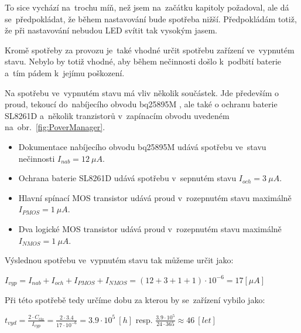 To sice vychází na~trochu míň, než jsem na~začátku kapitoly požadoval, ale dá se~předpokládat, že během nastavování bude spotřeba nižší.
Předpokládám totiž, že při nastavování nebudou LED svítit tak vysokým jasem.


Kromě spotřeby za provozu je~také vhodné určit spotřebu zařízení ve~vypnutém stavu.
Nebylo by totiž vhodné, aby během nečinnosti došlo k~podbití baterie a~tím pádem k~jejímu poškození.

Na spotřebu ve~vypnutém stavu má vliv několik součástek.
Jde především o proud, tekoucí do~nabíjecího obvodu bq25895M \cite{BQ25895}, ale také o ochranu baterie SL8261D \cite{SL8261} a~několik tranzistorů v~zapínacím obvodu uvedeném na~obr.~\ref{fig:PoverManager}.

\begin{itemize}
    \item Dokumentace nabíjecího obvodu bq25895M \cite{BQ25895} udává spotřebu ve~stavu nečinnosti \(I_{nab} = 12~\mu A\).
    \item Ochrana baterie SL8261D \cite{SL8261} udává spotřebu v~sepnutém stavu \(I_{och} = 3~\mu A\).
    \item Hlavní spínací MOS transistor \cite{WSD20L75DN33} udává proud v~rozepnutém stavu maximálně \(I_{PMOS} = 1~\mu A\).
    \item Dva logické MOS transistor \cite{N-MOS} udává proud v~rozepnutém stavu maximálně \(I_{NMOS} = 1~\mu A\).
\end{itemize}

Výslednou spotřebu ve~vypnutém stavu tak můžeme určit jako:

\vspace{5mm}
\large
\begin{centering}
\(
    I_{vyp} = I_{nab} + I_{och} + I_{PMOS} + I_{NMOS} = (12 + 3 + 1 + 1) \cdot 10^{-6} = 17 [\mu A]
\)
\end{centering}
\normalsize
\vspace{1mm}

Při této spotřebě tedy určíme dobu za kterou by se~zařízení vybilo jako:

\vspace{5mm}
\large
\begin{centering}
\(
    t_{vyd} = \frac{2 \cdot C_{čla}}{I_{vyp}} = \frac{2 \cdot 3.4}{17 \cdot 10^{-6}} = 3.9\cdot10^{5}~[h] \) resp. \(\frac{3.9\cdot10^{5}}{24\cdot365} \approx 46~[let]\)
\end{centering}
\normalsize
\vspace{1mm}

